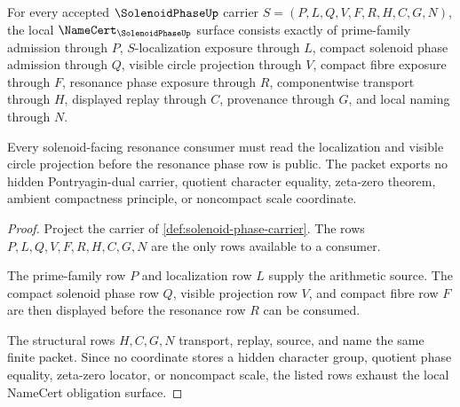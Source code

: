 \begin{theorem}
\label{thm:solenoid-phase-namecert-obligations}
For every accepted $\SolenoidPhaseUp$ carrier $S=(P,L,Q,V,F,R,H,C,G,N)$, the local $\NameCert_{\SolenoidPhaseUp}$ surface consists exactly of prime-family admission through $P$, $S$-localization exposure through $L$, compact solenoid phase admission through $Q$, visible circle projection through $V$, compact fibre exposure through $F$, resonance phase exposure through $R$, componentwise transport through $H$, displayed replay through $C$, provenance through $G$, and local naming through $N$.

Every solenoid-facing resonance consumer must read the localization and visible circle projection before the resonance phase row is public. The packet exports no hidden Pontryagin-dual carrier, quotient character equality, zeta-zero theorem, ambient compactness principle, or noncompact scale coordinate.
\end{theorem}
\begin{proof}
Project the carrier of \autoref{def:solenoid-phase-carrier}. The rows $P,L,Q,V,F,R,H,C,G,N$ are the only rows available to a consumer.

The prime-family row $P$ and localization row $L$ supply the arithmetic source. The compact solenoid phase row $Q$, visible projection row $V$, and compact fibre row $F$ are then displayed before the resonance row $R$ can be consumed.

The structural rows $H,C,G,N$ transport, replay, source, and name the same finite packet. Since no coordinate stores a hidden character group, quotient phase equality, zeta-zero locator, or noncompact scale, the listed rows exhaust the local NameCert obligation surface.
\end{proof}

